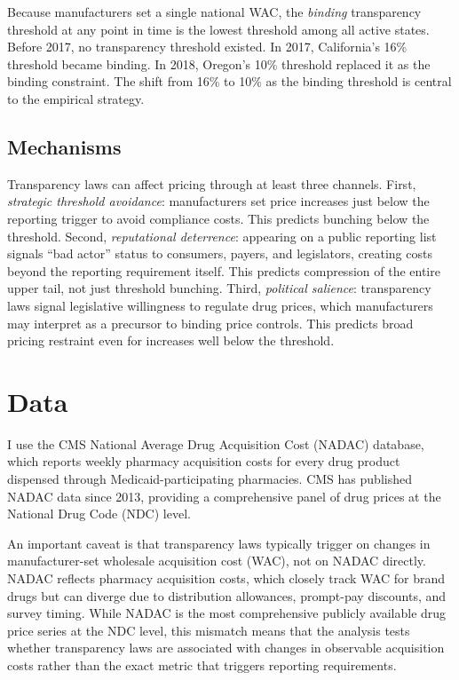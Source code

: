 \documentclass[12pt]{article}
\begin{document}
Because manufacturers set a single national WAC, the \textit{binding} transparency threshold at any point in time is the lowest threshold among all active states. Before 2017, no transparency threshold existed. In 2017, California's 16\% threshold became binding. In 2018, Oregon's 10\% threshold replaced it as the binding constraint. The shift from 16\% to 10\% as the binding threshold is central to the empirical strategy.

\subsection{Mechanisms}

Transparency laws can affect pricing through at least three channels. First, \textit{strategic threshold avoidance}: manufacturers set price increases just below the reporting trigger to avoid compliance costs. This predicts bunching below the threshold. Second, \textit{reputational deterrence}: appearing on a public reporting list signals ``bad actor'' status to consumers, payers, and legislators, creating costs beyond the reporting requirement itself. This predicts compression of the entire upper tail, not just threshold bunching. Third, \textit{political salience}: transparency laws signal legislative willingness to regulate drug prices, which manufacturers may interpret as a precursor to binding price controls. This predicts broad pricing restraint even for increases well below the threshold.


\section{Data}

I use the CMS National Average Drug Acquisition Cost (NADAC) database, which reports weekly pharmacy acquisition costs for every drug product dispensed through Medicaid-participating pharmacies. CMS has published NADAC data since 2013, providing a comprehensive panel of drug prices at the National Drug Code (NDC) level.

An important caveat is that transparency laws typically trigger on changes in manufacturer-set wholesale acquisition cost (WAC), not on NADAC directly. NADAC reflects pharmacy acquisition costs, which closely track WAC for brand drugs but can diverge due to distribution allowances, prompt-pay discounts, and survey timing. While NADAC is the most comprehensive publicly available drug price series at the NDC level, this mismatch means that the analysis tests whether transparency laws are associated with changes in observable acquisition costs rather than the exact metric that triggers reporting requirements.
\end{document}

